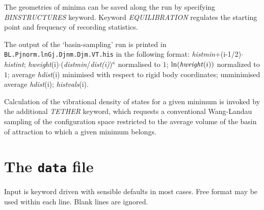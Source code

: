 \documentclass[12pt,a4paper,dvips]{article}
\begin{document}
The geometries of minima can be saved along the run by specifying {\it BINSTRUCTURES } keyword. Keyword {\it EQUILIBRATION}
regulates the starting point and frequency of recording statistics.

The output of the `basin-sampling' run is printed in {\tt BL.Pjnorm.lnGj.Djnm.Djm.VT.his} in the
following format: 
{\it histmin}+(i-1/2)$\cdot${\it histint}; {\it hweight}(i)$\cdot$({\it distmin}/{\it dist(i)})$^\kappa$ 
normalised to $1$; ${\it \ln(hweight}(i))$ normalized to $1$;
average {\it hdist}(i) minimised with respect to rigid body coordinates; unminimised average 
{\it hdist}(i); {\it histvals}(i). 

Calculation of the
vibrational density of states for a given minimum is invoked by 
the additional {\it TETHER} keyword, which
requests a conventional Wang-Landau sampling of the configuration 
space restricted to the average volume of the basin of
attraction to which a given minimum belongs.\cite{BogdanWC06}

\section{The {\tt data} file}

Input is keyword driven with sensible defaults in most cases. 
Free format may be used within each line. Blank lines are ignored.
\end{document}

